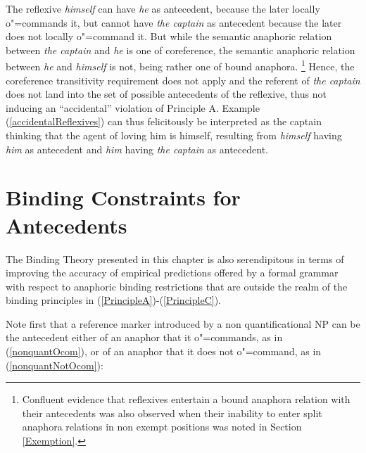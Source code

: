 \documentclass[output=paper
,modfonts
,nonflat]{langsci/langscibook}
\begin{document}
The reflexive {\em himself} can have {\em he} as antecedent, because the later locally
o"=commands it, but cannot have {\em the captain} as antecedent because the later
does not locally o"=command it. But while the semantic anaphoric relation between {\em the captain} 
and {\em he} is one of coreference, the semantic anaphoric relation between {\em he}
and {\em himself} is not, being rather one of bound anaphora.%
\footnote{
Confluent evidence that reflexives entertain a bound anaphora relation with their antecedents
was also observed when their inability to enter split anaphora relations in non exempt positions
was noted in Section \ref{Exemption}.
}
Hence, 
the coreference transitivity requirement does not apply and the referent
of {\em the captain} does not land into the set of possible antecedents
of the reflexive, thus not inducing an ``accidental'' violation of Principle A. Example  (\ref{accidentalReflexives})
can thus felicitously be interpreted as the captain thinking that the agent of loving him is himself,
resulting from {\em himself} having {\em him} as antecedent and {\em him} having {\em the captain} as antecedent.



\section{Binding Constraints for Antecedents \label{reverse}}

The Binding Theory presented in this chapter is also 
serendipitous in terms of improving the accuracy of empirical predictions offered 
by a formal grammar with respect to anaphoric binding restrictions that are outside the
realm of the binding principles in (\ref{PrincipleA})-(\ref{PrincipleC}).

Note first that a reference marker introduced by a non quantificational NP can be 
the antecedent either of an anaphor that it o"=commands, as in  (\ref{nonquantOcom}), or of an anaphor that
it does not o"=command, as in (\ref{nonquantNotOcom}):

\begin{exe}
\ex
\begin{xlist}
 \label{nonquantOcom}
 \label{nonquantNotOcom}
\end{xlist}
\end{exe}
\end{document}
